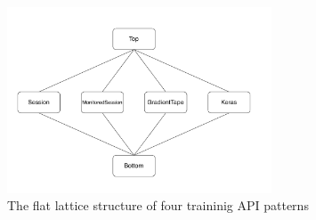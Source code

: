 \begin{figure}[ht!]
  \centering
  \includegraphics[width=0.7\textwidth]{lattice.pdf}
  \caption{The flat lattice structure of four traininig API patterns}
  \label{fig:pattern:lattice}
\end{figure}




%     
% 

